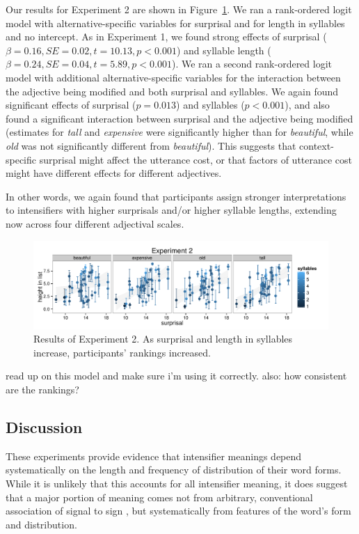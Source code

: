 \documentclass[10pt,letterpaper]{article}
\newcommand{\w}[1]{\emph{#1}}
\newcommand{\todo}[1]{{\color{red}#1}}
\begin{document}
Our results for Experiment 2 are shown in Figure~\ref{exp2-plot}. We ran a rank-ordered logit model \cite{beggs1981, hausman1987} with alternative-specific variables for surprisal and for length in syllables and no intercept. As in Experiment 1, we found strong effects of surprisal ($\beta=0.16, SE=0.02, t=10.13, p<0.001$) and syllable length ($\beta=0.24, SE=0.04, t=5.89, p<0.001$).
We ran a second rank-ordered logit model with additional alternative-specific variables for the interaction between the adjective being modified and both surprisal and syllables. We again found significant effects of surprisal ($p=0.013$) and syllables ($p<0.001$), and also found a significant interaction between surprisal and the adjective being modified (estimates for \w{tall} and \w{expensive} were significantly higher than for \w{beautiful}, while \w{old} was not significantly different from \w{beautiful}).
This suggests that context-specific surprisal might affect the utterance cost, or that factors of utterance cost might have different effects for different adjectives.

In other words, we again found that participants assign stronger interpretations to intensifiers with higher surprisals and/or higher syllable lengths, extending now across four different adjectival scales.

\begin{figure}[hbt]
\begin{center}
\includegraphics[width=\textwidth]{../analysis/output/Experiment2/scatter.pdf}
\end{center}
\caption{Results of Experiment 2. As surprisal and length in syllables increase, participants' rankings increased.} 
\label{exp2-plot}
\end{figure}

\todo{read up on this model and make sure i'm using it correctly. also: how consistent are the rankings?}

\subsection{Discussion}    
These experiments provide evidence that intensifier meanings depend systematically on the length and frequency of distribution of their word forms.
While it is unlikely that this accounts for all intensifier meaning, it does suggest that a major portion of meaning comes not from arbitrary, conventional association of signal to sign \cite{saussure}, but systematically from features of the word's form and distribution.
\end{document}
